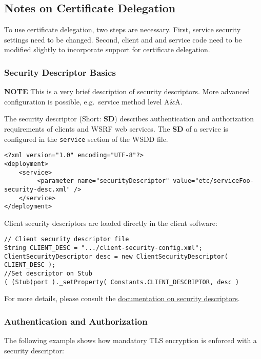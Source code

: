 \documentclass{article}
\begin{document}
\subsection{Notes on Certificate Delegation}

To use certificate delegation, two steps are necessary. First,
service security settings need to be changed. Second, client and
and service code need to be modified slightly to incorporate
support for certificate delegation.

\subsubsection{Security Descriptor Basics}

\textbf{NOTE} This is a very brief description of security
descriptors. More advanced configuration is possible, e.g.~service
method level A\&A.

The security descriptor (Short: \textbf{SD}) describes
authentication and authorization requirements of clients and WSRF
web services. The \textbf{SD} of a service is configured in the
\verb!service! section of the WSDD file.

\begin{verbatim}
<?xml version="1.0" encoding="UTF-8"?>
<deployment>
    <service>
         <parameter name="securityDescriptor" value="etc/serviceFoo-security-desc.xml" /> 
    </service>
</deployment>
\end{verbatim}

Client security descriptors are loaded directly in the client
software:

\begin{verbatim}
// Client security descriptor file 
String CLIENT_DESC = ".../client-security-config.xml";
ClientSecurityDescriptor desc = new ClientSecurityDescriptor( CLIENT_DESC );
//Set descriptor on Stub 
( (Stub)port )._setProperty( Constants.CLIENT_DESCRIPTOR, desc )
\end{verbatim}

For more details, please consult the
\href{http://www.globus.org/toolkit/docs/development/4.1.2/security/security-secdesc.html}{documentation on security descriptors}.

\subsubsection{Authentication and Authorization}

The following example shows how mandatory TLS encryption is
enforced with a security descriptor:
\end{document}
